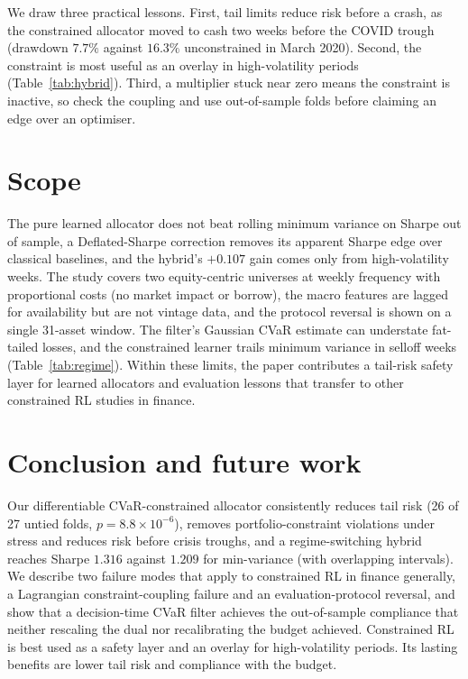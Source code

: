 \documentclass[sigconf]{acmart}
\begin{document}
We draw three practical lessons. First, tail limits reduce risk before a crash, as the constrained allocator moved to cash two weeks before the COVID trough (drawdown $7.7\%$ against
$16.3\%$ unconstrained in March 2020). Second, the constraint is most useful as an overlay in high-volatility
periods (Table~\ref{tab:hybrid}). Third, a multiplier stuck near zero means the constraint is inactive, so check the coupling and use out-of-sample folds before claiming an edge over an
optimiser.

\section{Scope}
\label{sec:limitations}
The pure learned allocator does not beat rolling minimum variance on Sharpe out of sample, a
Deflated-Sharpe correction removes its apparent Sharpe edge over classical baselines, and the
hybrid's $+0.107$ gain comes only from high-volatility weeks. The study covers two
equity-centric universes at weekly frequency with proportional costs (no market impact or
borrow), the macro features are lagged for availability but are not vintage data, and the
protocol reversal is shown on a single 31-asset window. The filter's Gaussian CVaR estimate can
understate fat-tailed losses, and the constrained learner trails minimum variance in selloff
weeks (Table~\ref{tab:regime}). Within these limits, the paper contributes a tail-risk safety
layer for learned allocators and evaluation lessons that transfer to other constrained RL
studies in finance.

\section{Conclusion and future work}
\label{sec:conclusion}

Our differentiable CVaR-constrained allocator consistently reduces tail risk (26 of 27 untied
folds, $p=8.8\!\times\!10^{-6}$), removes portfolio-constraint violations under stress and
reduces risk before crisis troughs, and a regime-switching hybrid reaches Sharpe $1.316$
against $1.209$ for min-variance (with overlapping intervals). We describe two failure modes
that apply to constrained RL in finance generally, a Lagrangian constraint-coupling
failure and an evaluation-protocol reversal, and show that a decision-time CVaR filter
achieves the out-of-sample compliance that neither rescaling the dual nor recalibrating the
budget achieved. Constrained RL is best used as a safety layer and an overlay for
high-volatility periods. Its lasting benefits are lower tail risk and compliance with the
budget.



\end{document}
